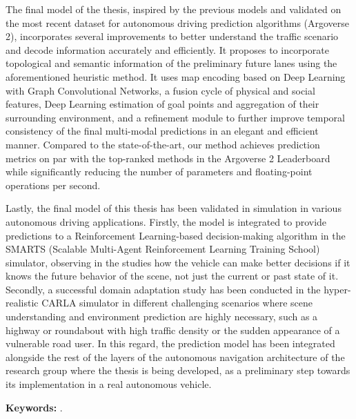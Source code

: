 The final model of the thesis, inspired by the previous models and validated on the most recent dataset for autonomous driving prediction algorithms (Argoverse 2), incorporates several improvements to better understand the traffic scenario and decode information accurately and efficiently. It proposes to incorporate topological and semantic information of the preliminary future lanes using the aforementioned heuristic method. It uses map encoding based on Deep Learning with Graph Convolutional Networks, a fusion cycle of physical and social features, Deep Learning estimation of goal points and aggregation of their surrounding environment, and a refinement module to further improve temporal consistency of the final multi-modal predictions in an elegant and efficient manner. Compared to the state-of-the-art, our method achieves prediction metrics on par with the top-ranked methods in the Argoverse 2 Leaderboard while significantly reducing the number of parameters and floating-point operations per second.

Lastly, the final model of this thesis has been validated in simulation in various autonomous driving applications. Firstly, the model is integrated to provide predictions to a Reinforcement Learning-based decision-making algorithm in the SMARTS (Scalable Multi-Agent Reinforcement Learning Training School) simulator, observing in the studies how the vehicle can make better decisions if it knows the future behavior of the scene, not just the current or past state of it. Secondly, a successful domain adaptation study has been conducted in the hyper-realistic CARLA simulator in different challenging scenarios where scene understanding and environment prediction are highly necessary, such as a highway or roundabout with high traffic density or the sudden appearance of a vulnerable road user. In this regard, the prediction model has been integrated alongside the rest of the layers of the autonomous navigation architecture of the research group where the thesis is being developed, as a preliminary step towards its implementation in a real autonomous vehicle.

\textbf{Keywords:} \myThesisKeywordsEnglish.



